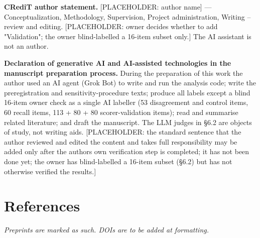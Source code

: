 \documentclass[10pt]{article}
\begin{document}
\textbf{CRediT author statement.} {[}PLACEHOLDER: author name{]} --- Conceptualization, Methodology, Supervision, Project administration, Writing -- review and editing. {[}PLACEHOLDER: owner decides whether to add "Validation"; the owner blind-labelled a 16-item subset only.{]} The AI assistant is not an author.

\textbf{Declaration of generative AI and AI-assisted technologies in the manuscript preparation process.} During the preparation of this work the author used an AI agent (Grok Bot) to write and run the analysis code; write the preregistration and sensitivity-procedure texts; produce all labels except a blind 16-item owner check as a single AI labeller (53 disagreement and control items, 60 recall items, 113 + 80 + 80 scorer-validation items); read and summarise related literature; and draft the manuscript. The LLM judges in §6.2 are objects of study, not writing aids. {[}PLACEHOLDER: the standard sentence that the author reviewed and edited the content and takes full responsibility may be added only after the author\textquotesingle s own verification step is completed; it has not been done yet; the owner has blind-labelled a 16-item subset (§6.2) but has not otherwise verified the results.{]}

\section{References}\label{references}

\emph{Preprints are marked as such. DOIs are to be added at formatting.}
\end{document}
